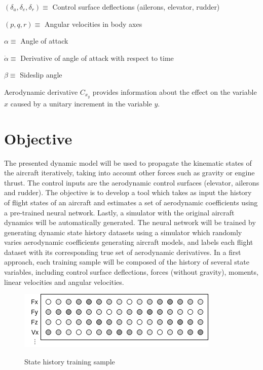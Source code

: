 \documentclass[12pt]{article}
\begin{document}
$(\delta_a, \delta_e, \delta_r) \equiv$ Control surface deflections (ailerons, elevator, rudder)

$(p, q, r) \equiv$ Angular velocities in body axes

$\alpha \equiv$ Angle of attack

$\dot{\alpha} \equiv$ Derivative of angle of attack with respect to time

$\beta \equiv$ Sideslip angle \newline

Aerodynamic derivative $C_{x_y}$ provides information about the effect on the variable $x$ caused by a unitary increment in the variable $y$.

\section{Objective}

The presented dynamic model will be used to propagate the kinematic states of the aircraft iteratively, taking into account other forces such as gravity or engine thrust. The control inputs are the aerodynamic control surfaces (elevator, ailerons and rudder). The objective is to develop a tool which takes as input the history of flight states of an aircraft and estimates a set of aerodynamic coefficients using a pre-trained neural network. Lastly, a simulator with the original aircraft dynamics will be automatically generated. The neural network will be trained by generating dynamic state history datasets using a simulator which randomly varies aerodynamic coefficients generating aircraft models, and labels each flight dataset with its corresponding true set of aerodynamic derivatives. In a first approach, each training sample will be composed of the history of several state variables, including control surface deflections, forces (without gravity), moments, linear velocities and angular velocities.

\setcounter{figure}{1}
\begin{figure}[H]
\centering
\includegraphics[width = .6\textwidth]{diagram}
\label{fig:A.2}
\caption{State history training sample}
\end{figure}
\end{document}
